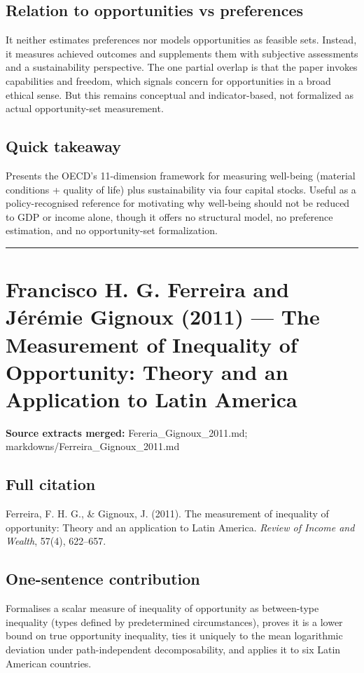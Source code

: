 \documentclass[11pt,a4paper]{article}
\begin{document}
\subsection*{Relation to opportunities vs preferences}
It neither estimates preferences nor models opportunities as feasible sets. Instead, it measures achieved outcomes and supplements them with subjective assessments and a sustainability perspective. The one partial overlap is that the paper invokes capabilities and freedom, which signals concern for opportunities in a broad ethical sense. But this remains conceptual and indicator-based, not formalized as actual opportunity-set measurement.

\subsection*{Quick takeaway}
Presents the OECD's 11-dimension framework for measuring well-being (material conditions + quality of life) plus sustainability via four capital stocks. Useful as a policy-recognised reference for motivating why well-being should not be reduced to GDP or income alone, though it offers no structural model, no preference estimation, and no opportunity-set formalization.


\medskip\hrule\medskip

\section*{Francisco H. G. Ferreira and Jérémie Gignoux (2011) — The Measurement of Inequality of Opportunity: Theory and an Application to Latin America}

\textbf{Source extracts merged:} Fereria\_Gignoux\_2011.md; markdowns/Ferreira\_Gignoux\_2011.md

\subsection*{Full citation}
Ferreira, F. H. G., \& Gignoux, J. (2011). The measurement of inequality of opportunity: Theory and an application to Latin America. \textit{Review of Income and Wealth}, 57(4), 622--657.

\subsection*{One-sentence contribution}
Formalises a scalar measure of inequality of opportunity as between-type inequality (types defined by predetermined circumstances), proves it is a lower bound on true opportunity inequality, ties it uniquely to the mean logarithmic deviation under path-independent decomposability, and applies it to six Latin American countries.
\end{document}
